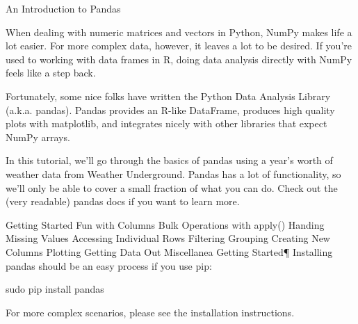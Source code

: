 An Introduction to Pandas


When dealing with numeric matrices and vectors in Python, NumPy makes life a lot easier. For more complex data, however, it leaves a lot to be desired. If you're used to working with data frames in R, doing data analysis directly with NumPy feels like a step back.

Fortunately, some nice folks have written the Python Data Analysis Library (a.k.a. pandas). Pandas provides an R-like DataFrame, produces high quality plots with matplotlib, and integrates nicely with other libraries that expect NumPy arrays.

In this tutorial, we'll go through the basics of pandas using a year's worth of weather data from Weather Underground. Pandas has a lot of functionality, so we'll only be able to cover a small fraction of what you can do. Check out the (very readable) pandas docs if you want to learn more.

Getting Started
Fun with Columns
Bulk Operations with apply()
Handing Missing Values
Accessing Individual Rows
Filtering
Grouping
Creating New Columns
Plotting
Getting Data Out
Miscellanea
Getting Started¶
Installing pandas should be an easy process if you use pip:

sudo pip install pandas

For more complex scenarios, please see the installation instructions.

